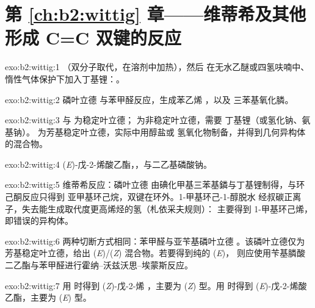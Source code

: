 \section*{第 \ref{ch:b2:wittig} 章——维蒂希及其他形成 C=C 双键的反应}

\begin{solution}{exo:b2:wittig:1}
（双分子取代，在溶剂中加热），然后
在无水乙醚或四氢呋喃中、惰性气体保护下加入丁基锂：。
\end{solution}

\begin{solution}{exo:b2:wittig:2}
磷叶立德  与苯甲醛反应，生成苯乙烯 ，以及
三苯基氧化膦。
\end{solution}

\begin{solution}{exo:b2:wittig:3}
 与  为稳定叶立德； 为非稳定叶立德，需要
丁基锂（或氢化钠、氨基钠）。 为芳基稳定叶立德，实际中用醇盐或
氢氧化物制备，并得到几何异构体的混合物。
\end{solution}

\begin{solution}{exo:b2:wittig:4}
(\textit{E})-戊-2-烯酸乙酯，，与二乙基磷酸钠。
\end{solution}

\begin{solution}{exo:b2:wittig:5}
维蒂希反应：磷叶立德  由碘化甲基三苯基鏻与丁基锂制得，与环己酮反应只得到
亚甲基环己烷，双键在环外。1-甲基环己-1-醇脱水
经叔碳正离子，失去能生成取代度更高烯烃的氢（札依采夫规则）：
主要得到 1-甲基环己烯，即错误的异构体。
\end{solution}

\begin{solution}{exo:b2:wittig:6}
两种切断方式相同：苯甲醛与亚苄基磷叶立德 。该磷叶立德仅为
芳基稳定叶立德，给出 (\textit{E})/(\textit{Z}) 混合物。若要得到纯的 (\textit{E})，
则应使用苄基膦酸二乙酯与苯甲醛进行霍纳–沃兹沃思–埃蒙斯反应。
\end{solution}

\begin{solution}{exo:b2:wittig:7}
用  时得到 (\textit{Z})-戊-2-烯 ，主要为 (\textit{Z}) 型。用
 时得到 (\textit{E})-戊-2-烯酸乙酯，主要为 (\textit{E}) 型。
\end{solution}

